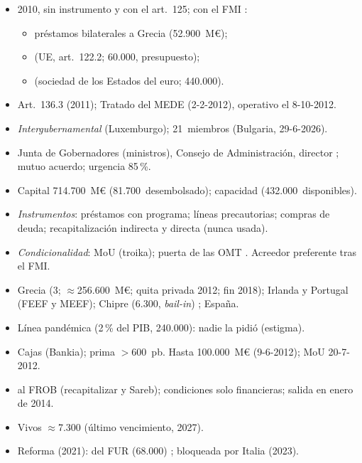 \documentclass{article}
\begin{document}
\begin{columnas}
\begin{itemize}
\item 2010, sin instrumento y con el art.~125; con el FMI :
  \begin{itemize}
  \item préstamos bilaterales a Grecia (52.900~M€);
  \item {} (UE, art.~122.2; 60.000, presupuesto);
  \item {} (sociedad de los Estados del euro; 440.000).
  \end{itemize}
\item Art.~136.3 (2011); Tratado del MEDE (2-2-2012), operativo el 8-10-2012.
\end{itemize}
\begin{itemize}
\item \emph{Intergubernamental} (Luxemburgo); 21~miembros (Bulgaria, 29-6-2026).
\item Junta de Gobernadores (ministros), Consejo de Administración, director ; mutuo acuerdo; urgencia 85\,\%.
\item Capital 714.700~M€ (81.700~desembolsado); capacidad  (432.000~disponibles).
\item \emph{Instrumentos}: préstamos con programa; líneas precautorias; compras de deuda; recapitalización indirecta y directa (nunca usada).
\item \emph{Condicionalidad}: MoU (troika); puerta de las OMT . Acreedor preferente tras el FMI.
\end{itemize}
\begin{itemize}
\item Grecia (3; $\approx$256.600~M€; quita privada 2012; fin 2018); Irlanda y Portugal (FEEF y MEEF); Chipre (6.300, \emph{bail-in}) ; España.
\item Línea pandémica (2\,\% del PIB, 240.000): nadie la pidió (estigma).
\end{itemize}
\begin{itemize}
\item Cajas (Bankia); prima $>$600~pb. Hasta 100.000~M€ (9-6-2012); MoU 20-7-2012.
\item {} al FROB (recapitalizar y Sareb); condiciones solo financieras; salida en enero de 2014.
\item Vivos $\approx$7.300 (último vencimiento, 2027).
\end{itemize}
\begin{itemize}
\item Reforma (2021):  del FUR (68.000) ; bloqueada por Italia (2023).
\end{itemize}


\end{columnas}
\end{document}
